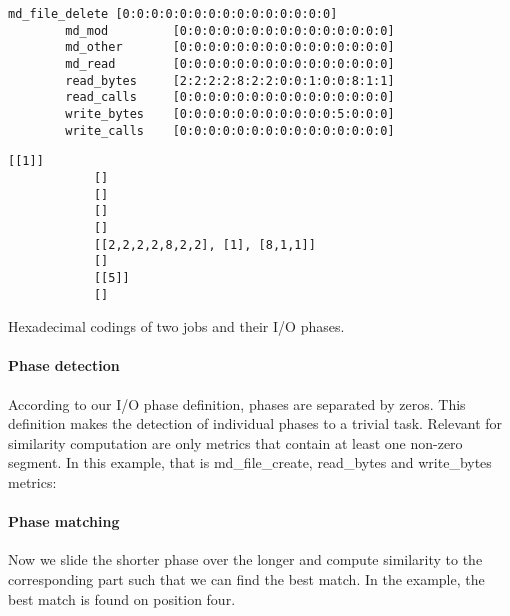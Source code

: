 \documentclass{jhps}
\begin{document}
\begin{listing}
\begin{minipage}{\textwidth}
\begin{minipage}{0.60\textwidth}
\begin{lstlisting}[basicstyle=\fontsize{8}{8}\ttfamily]
		md_file_delete [0:0:0:0:0:0:0:0:0:0:0:0:0:0:0]
		md_mod         [0:0:0:0:0:0:0:0:0:0:0:0:0:0:0]
		md_other       [0:0:0:0:0:0:0:0:0:0:0:0:0:0:0]
		md_read        [0:0:0:0:0:0:0:0:0:0:0:0:0:0:0]
		read_bytes     [2:2:2:2:8:2:2:0:0:1:0:0:8:1:1]
		read_calls     [0:0:0:0:0:0:0:0:0:0:0:0:0:0:0]
		write_bytes    [0:0:0:0:0:0:0:0:0:0:0:5:0:0:0]
		write_calls    [0:0:0:0:0:0:0:0:0:0:0:0:0:0:0]
		\end{lstlisting}
		\vspace{-2em}
		\label{lst:sim:pm_quant:job_b}
		\end{minipage}
		\noindent\begin{minipage}{0.39\textwidth}
			\begin{lstlisting}[basicstyle=\fontsize{8}{8}\ttfamily]
			[[1]]
			[]
			[]
			[]
			[]
			[[2,2,2,2,8,2,2], [1], [8,1,1]]
			[]
			[[5]]
			[]
			\end{lstlisting}
			\vspace{-2em}
			\label{lst:sim:pm_quant:phases:job_b}
		\end{minipage}
	\end{minipage}
	\caption{Hexadecimal codings of two jobs and their I/O phases.}
	\label{lst:sim:pm_quant}
\end{listing}



\paragraph{Phase detection}
According to our I/O phase definition, phases are separated by zeros.
This definition makes the detection of individual phases to a trivial task.
Relevant for similarity computation are only metrics that contain at least one non-zero segment.
In this example, that is md\_file\_create, read\_bytes and write\_bytes metrics:


\paragraph{Phase matching}
Now we slide the shorter phase over the longer and compute similarity to the corresponding part such that we can find the best match.
In the example, the best match is found on position four.
\end{document}
